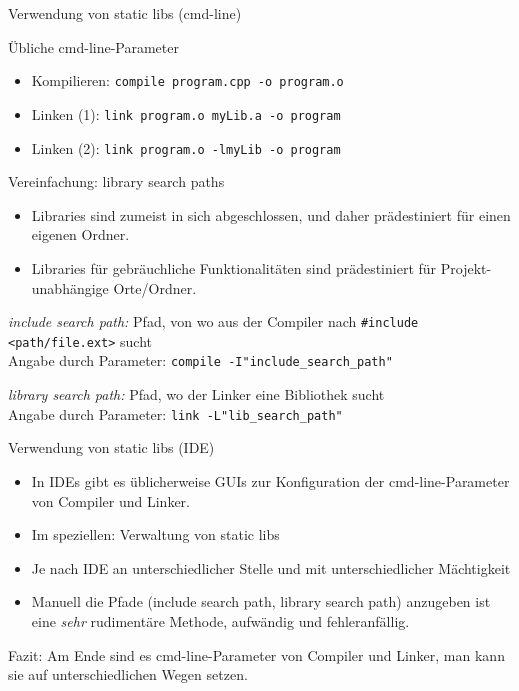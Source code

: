 \begin{frame}[fragile]{Verwendung von static libs (cmd-line)}
	\footnotesize
	
	\begin{block}{Übliche cmd-line-Parameter}
		\begin{itemize}
			\item Kompilieren: \verb|compile program.cpp -o program.o| \\
			\item Linken (1): \verb|link program.o myLib.a -o program| \\
			\item Linken (2): \verb|link program.o -lmyLib -o program|
		\end{itemize}
	\end{block}
	
	\pause
	
	\begin{block}{Vereinfachung: library search paths}
		\begin{itemize}
			\item Libraries sind zumeist in sich abgeschlossen, und daher prädestiniert für einen eigenen Ordner.
			\item Libraries für gebräuchliche Funktionalitäten sind prädestiniert für Projekt-unabhängige Orte/Ordner.
		\end{itemize}
		
		\pause
		
		\emph{include search path:} Pfad, von wo aus der Compiler nach {\tiny \verb|#include <path/file.ext>| } sucht \\
		Angabe durch Parameter: \verb|compile -I"include_search_path"|
		
		\pause
		\vspace{0.5em}
		
		\emph{library search path:} Pfad, wo der Linker eine Bibliothek sucht \\
		Angabe durch Parameter: \verb|link -L"lib_search_path"|
	\end{block}
\end{frame}

\begin{frame}{Verwendung von static libs (IDE)}
	\begin{itemize}[<+->]
		\item In IDEs gibt es üblicherweise GUIs zur Konfiguration der cmd-line-Parameter von Compiler und Linker.
		\item Im speziellen: Verwaltung von static libs
		\item Je nach IDE an unterschiedlicher Stelle und mit unterschiedlicher Mächtigkeit
		\item \alert{ Manuell die Pfade {\tiny (include search path, library search path) } anzugeben ist eine \emph{sehr} rudimentäre Methode, aufwändig und fehleranfällig. }
	\end{itemize}
	
	\vspace{2em}
	
	\uncover<+->
	{
		Fazit: Am Ende sind es cmd-line-Parameter von Compiler und Linker, man kann sie auf unterschiedlichen Wegen setzen.
	}
\end{frame}

